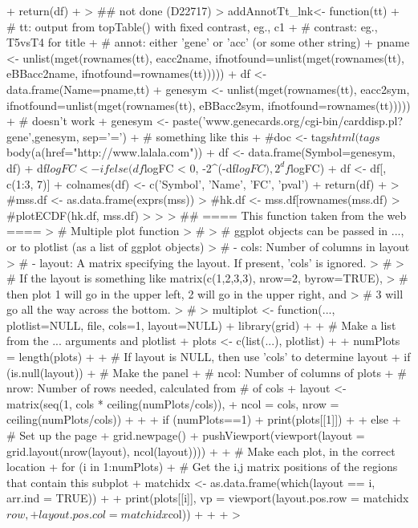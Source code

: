 \documentclass[a4paper]{article}
\begin{document}
\begin{Schunk}
\begin{Sinput}
{+     return(df)
+ }
> ## not done (D22717)
> addAnnotTt_lnk<- function(tt) {
+     # tt: output from topTable() with fixed contrast, eg., c1
+     # contrast: eg., T5vsT4 for title
+     # annot: either 'gene' or 'acc' (or some other string)
+     pname <- unlist(mget(rownames(tt), eacc2name, ifnotfound=unlist(mget(rownames(tt), eBBacc2name, ifnotfound=rownames(tt)))))
+     df <- data.frame(Name=pname,tt)
+     genesym <- unlist(mget(rownames(tt), eacc2sym, ifnotfound=unlist(mget(rownames(tt), eBBacc2sym, ifnotfound=rownames(tt)))))
+     # doesn't work
+     genesym <- paste('www.genecards.org/cgi-bin/carddisp.pl?gene',genesym, sep='=')
+     # something like this
+     #doc <- tags$html(tags$body(a(href="http://www.lalala.com"))
+     df <- data.frame(Symbol=genesym, df)
+     df$logFC <- ifelse(df$logFC < 0, -2^(-df$logFC), 2^df$logFC)
+     df <- df[, c(1:3, 7)]
+     colnames(df) <- c('Symbol', 'Name', 'FC', 'pval')
+     return(df)
+ }
> #mss.df <- as.data.frame(exprs(mss))
> #hk.df <- mss.df[rownames(mss.df) %in% hk,]
> #plotECDF(hk.df, mss.df)
> 
> 
> ## ==== This function taken from the web ====
> # Multiple plot function
> #
> # ggplot objects can be passed in ..., or to plotlist (as a list of ggplot objects)
> # - cols:   Number of columns in layout
> # - layout: A matrix specifying the layout. If present, 'cols' is ignored.
> #
> # If the layout is something like matrix(c(1,2,3,3), nrow=2, byrow=TRUE),
> # then plot 1 will go in the upper left, 2 will go in the upper right, and
> # 3 will go all the way across the bottom.
> #
> multiplot <- function(..., plotlist=NULL, file, cols=1, layout=NULL) {
+     library(grid)
+ 
+     # Make a list from the ... arguments and plotlist
+     plots <- c(list(...), plotlist)
+ 
+     numPlots = length(plots)
+ 
+     # If layout is NULL, then use 'cols' to determine layout
+     if (is.null(layout)) {
+         # Make the panel
+         # ncol: Number of columns of plots
+         # nrow: Number of rows needed, calculated from # of cols
+         layout <- matrix(seq(1, cols * ceiling(numPlots/cols)),
+                          ncol = cols, nrow = ceiling(numPlots/cols))
+     }
+ 
+     if (numPlots==1) {
+         print(plots[[1]])
+ 
+     } else {
+         # Set up the page
+         grid.newpage()
+         pushViewport(viewport(layout = grid.layout(nrow(layout), ncol(layout))))
+ 
+         # Make each plot, in the correct location
+         for (i in 1:numPlots) {
+         # Get the i,j matrix positions of the regions that contain this subplot
+             matchidx <- as.data.frame(which(layout == i, arr.ind = TRUE))
+ 
+             print(plots[[i]], vp = viewport(layout.pos.row = matchidx$row,
+                                             layout.pos.col = matchidx$col))
+         }
+     }
+ }
> 
\end{Sinput}
\end{Schunk}
\end{document}
